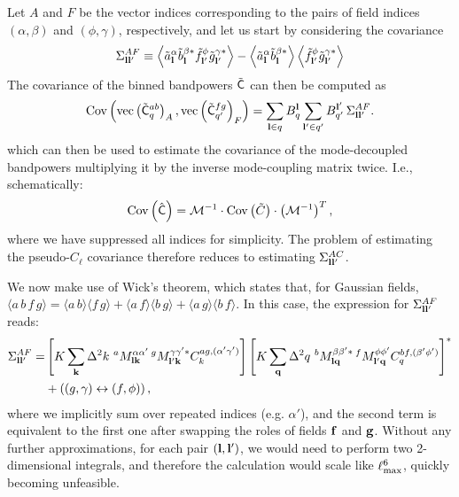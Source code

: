 \documentclass[a4paper,11pt]{article}
\newcommand{\summ}[1]{\sum_{\bf #1}\Delta^2 #1\,}
\begin{document}
      Let $A$ and $F$ be the vector indices corresponding to the pairs of
      field indices $(\alpha,\beta)$ and $(\phi,\gamma)$, respectively, and let us start by considering the covariance
      \begin{equation}
        \Sigma^{AF}_{{\bf l}{\bf l}'}\equiv\left\langle\tilde{a}^\alpha_{\bf l}\tilde{b}^{\beta *}_{\bf l}\tilde{f}^\phi_{{\bf l}'}\tilde{g}^{\gamma *}_{{\bf l}'}\right\rangle-\left\langle\tilde{a}^\alpha_{\bf l}\tilde{b}^{\beta *}_{\bf l}\right\rangle\left\langle\tilde{f}^\phi_{{\bf l}'}\tilde{g}^{\gamma *}_{{\bf l}'}\right\rangle
      \end{equation}
      The covariance of the binned bandpowers $\tilde{\sf C}$ can then be computed as
      \begin{equation}\label{eq:cov_binned}
        {\rm Cov}\left({\rm vec}\left(\tilde{\sf C}^{ab}_q\right)_A,{\rm vec}\left(\tilde{\sf C}^{fg}_{q'}\right)_F\right)=\sum_{{\bf l}\in q} B^{\bf l}_q\sum_{{\bf l}'\in q'} B^{{\bf l}'}_{q'}\,\Sigma^{AF}_{{\bf l}{\bf l}'}.
      \end{equation}
      which can then be used to estimate the covariance of the mode-decoupled bandpowers multiplying it by the inverse mode-coupling matrix twice. I.e., schematically:
      \begin{equation}
        {\rm Cov}\left(\hat{\sf C}\right)=\mathcal{M}^{-1}\cdot{\rm Cov}\left(\tilde{C}\right)\cdot\left(\mathcal{M}^{-1}\right)^{T},
      \end{equation}
      where we have suppressed all indices for simplicity. The problem of estimating the pseudo-$C_\ell$ covariance therefore reduces to estimating $\Sigma^{AC}_{{\bf l}{\bf l}'}$.
    
      We now make use of Wick's theorem, which states that, for Gaussian fields, $\langle a\,b\,f\,g\rangle=\langle a\,b\rangle\langle f\,g\rangle+\langle a\,f\rangle\langle b\,g\rangle+\langle a\,g\rangle\langle b\,f\rangle$. In this case, the expression for $\Sigma^{AF}_{{\bf l}{\bf l'}}$ reads:
      \begin{align}\nonumber
        \Sigma^{AF}_{{\bf l}{\bf l}'}=&\left[K\summ{k}\,^aM^{\alpha\alpha'}_{{\bf l}{\bf k}}\,^gM^{\gamma\gamma'*}_{{\bf l}'{\bf k}}C^{ag,(\alpha'\gamma')}_k\right]\left[K\summ{q}\,^bM^{\beta\beta'*}_{{\bf l}{\bf q}}\,^fM^{\phi\phi'}_{{\bf l}'{\bf q}}C^{bf,(\beta'\phi')}_q\right]^*\\\label{eq:covar_general}
        &+\left((g,\gamma)\leftrightarrow(f,\phi)\right),
      \end{align}
      where we implicitly sum over repeated indices (e.g. $\alpha'$), and the second term is equivalent to the first one after swapping the roles of fields ${\bf f}$ and ${\bf g}$. Without any further approximations, for each pair $({\bf l},{\bf l}')$, we would need to perform two 2-dimensional integrals, and therefore the calculation would scale like $\ell_{\rm max}^6$, quickly becoming unfeasible.
    
\end{document}
